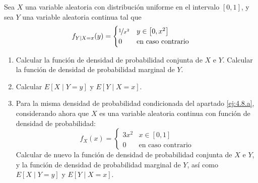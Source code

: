 \begin{ejercicio}
    Sea $X$ una variable aleatoria con distribución uniforme en el intervalo $[0,1]$, y sea $Y$ una variable aleatoria continua tal que
    \begin{equation*}
        f_{Y\mid X=x}(y) = \begin{cases}
            \nicefrac{1}{x^2} & y \in \left[0, x^2\right]\\
            0 & \text{en caso contrario}
        \end{cases}
    \end{equation*}
    \begin{enumerate}
        \item\label{ej:4.8.a} Calcular la función de densidad de probabilidad conjunta de $X$ e $Y$. Calcular la función de densidad de probabilidad marginal de $Y$.
        \item Calcular $E[X\mid Y = y]$ y $E[Y\mid X = x]$.
        \item Para la misma densidad de probabilidad condicionada del apartado \ref{ej:4.8.a}, considerando ahora que $X$ es una variable aleatoria continua con función de densidad de probabilidad:
        \begin{equation*}
            f_X(x) = \begin{cases}
                3x^2 & x \in \left[0,1\right]\\
                0 & \text{en caso contrario}
            \end{cases}
        \end{equation*}
        Calcular de nuevo la función de densidad de probabilidad conjunta de $X$ e $Y$, y la función de densidad de probabilidad marginal de $Y$, así como $E[X\mid Y = y]$ y $E[Y\mid X = x]$.
    \end{enumerate}
\end{ejercicio}

